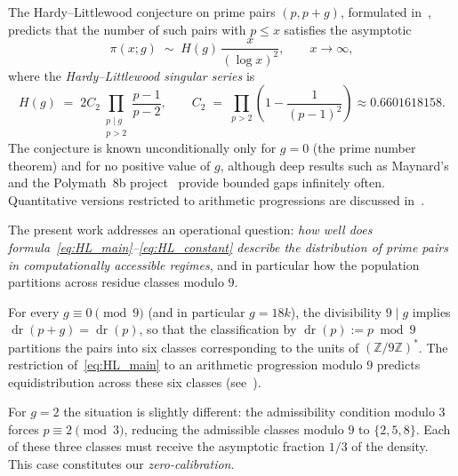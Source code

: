 \documentclass[11pt]{amsart}
\theoremstyle{plain}
\theoremstyle{definition}
\theoremstyle{remark}
\DeclareMathOperator{\dr}{dr}
\begin{document}
The Hardy--Littlewood conjecture on prime pairs $(p,p+g)$, formulated
in~\cite{HL23}, predicts that the number of such pairs with $p \le x$
satisfies the asymptotic
\begin{equation}\label{eq:HL_main}
  \pi(x;g) \;\sim\; H(g) \,\frac{x}{(\log x)^2},
  \qquad x \to \infty,
\end{equation}
where the \emph{Hardy--Littlewood singular series} is
\begin{equation}\label{eq:HL_constant}
  H(g) \;=\; 2 C_2 \prod_{\substack{p \mid g \\ p > 2}} \frac{p-1}{p-2},
  \qquad
  C_2 \;=\; \prod_{p>2}\!\left(1 - \frac{1}{(p-1)^2}\right)
  \approx 0.6601618158.
\end{equation}
The conjecture is known unconditionally only for $g=0$ (the prime
number theorem) and for no positive value of $g$, although deep
results such as Maynard's~\cite{May15} and the Polymath~8b
project~\cite{Pol14} provide bounded gaps infinitely often.
Quantitative versions restricted to arithmetic progressions are
discussed in~\cite{HR74,IK04}.

\medskip
The present work addresses an operational question:
\emph{how well does formula~\eqref{eq:HL_main}--\eqref{eq:HL_constant}
describe the distribution of prime pairs in computationally accessible
regimes}, and in particular how the population partitions across
residue classes modulo $9$.

\smallskip
For every $g \equiv 0 \pmod 9$ (and in particular $g = 18k$), the
divisibility $9 \mid g$ implies $\dr(p+g) = \dr(p)$, so that the
classification by $\dr(p) := p \bmod 9$ partitions the pairs into six
classes corresponding to the units of $(\mathbb{Z}/9\mathbb{Z})^*$. The
restriction of~\eqref{eq:HL_main} to an arithmetic progression modulo
$9$ predicts equidistribution across these six classes
(see~).

\smallskip
For $g=2$ the situation is slightly different: the admissibility
condition modulo $3$ forces $p \equiv 2 \pmod 3$, reducing the
admissible classes modulo $9$ to $\{2,5,8\}$. Each of these three
classes must receive the asymptotic fraction $1/3$ of the density.
This case constitutes our \emph{zero-calibration}.
\end{document}
